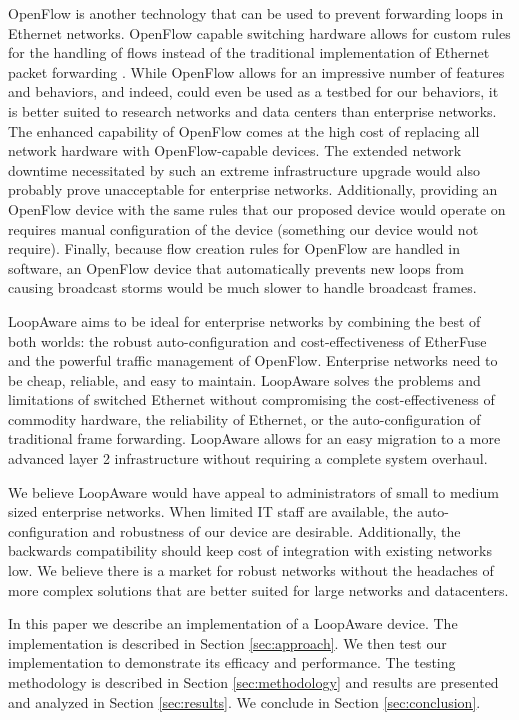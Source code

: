 	OpenFlow is another technology that can be used to prevent forwarding loops in Ethernet networks.
	OpenFlow capable switching hardware allows for custom rules for the handling of flows instead of the traditional implementation of Ethernet packet forwarding \cite{openflow}.
	While OpenFlow allows for an impressive number of features and behaviors, and indeed, could even be used as a testbed for our behaviors, it is better suited to research networks and data centers than enterprise networks.
	The enhanced capability of OpenFlow comes at the high cost of replacing all network hardware with OpenFlow-capable devices.
	The extended network downtime necessitated by such an extreme infrastructure upgrade would also probably prove unacceptable for enterprise networks.
	Additionally, providing an OpenFlow device with the same rules that our proposed device would operate on requires manual configuration of the device (something our device would not require).
	Finally, because flow creation rules for OpenFlow are handled in software, an OpenFlow device that automatically prevents new loops from causing broadcast storms would be much slower to handle broadcast frames.

	LoopAware aims to be ideal for enterprise networks by combining the best of both worlds: the robust auto-configuration and cost-effectiveness of EtherFuse and the powerful traffic management of OpenFlow.
	Enterprise networks need to be cheap, reliable, and easy to maintain.
	LoopAware solves the problems and limitations of switched Ethernet without compromising the cost-effectiveness of commodity hardware, the reliability of Ethernet, or the auto-configuration of traditional frame forwarding.
	LoopAware allows for an easy migration to a more advanced layer 2 infrastructure without requiring a complete system overhaul.
	
	We believe LoopAware would have appeal to administrators of small to medium sized enterprise networks.
	When limited IT staff are available, the auto-configuration and robustness of our device are desirable.
	Additionally, the backwards compatibility should keep cost of integration with existing networks low.
	We believe there is a market for robust networks without the headaches of more complex solutions that are better suited for large networks and datacenters.
	
	In this paper we describe an implementation of a LoopAware device.
	The implementation is described in Section \ref{sec:approach}.
	We then test our implementation to demonstrate its efficacy and performance.
	The testing methodology is described in Section \ref{sec:methodology} and results are presented and analyzed in Section \ref{sec:results}.
	We conclude in Section \ref{sec:conclusion}.
